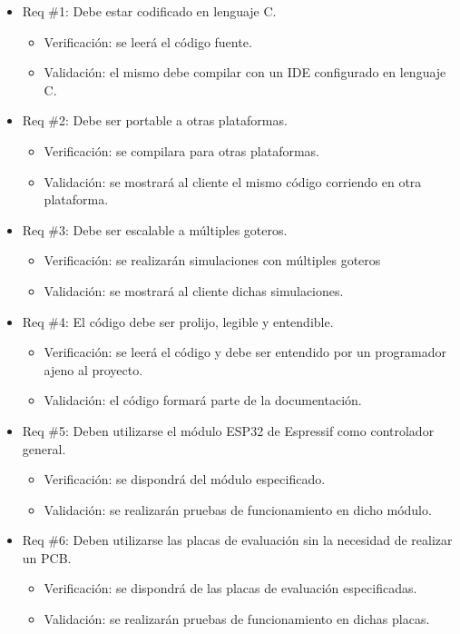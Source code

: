 \documentclass[
11pt, %
]{charter}
\begin{document}
\begin{itemize} 
\item Req \#1: Debe estar codificado en lenguaje C.
\begin{itemize}
	\item Verificación: se leerá el código fuente.
	\item Validación: el mismo debe compilar con un IDE configurado en lenguaje C.
\end{itemize}

\item Req \#2: Debe ser portable a otras plataformas.
\begin{itemize}
	\item Verificación: se compilara para otras plataformas.
	\item Validación: se mostrará al cliente el mismo código corriendo en otra plataforma.
\end{itemize}

\item Req \#3: Debe ser escalable a múltiples goteros.
\begin{itemize}
	\item Verificación: se realizarán simulaciones con múltiples goteros
	\item Validación: se mostrará al cliente dichas simulaciones.
\end{itemize}

\item Req \#4: El código debe ser prolijo, legible y entendible.
\begin{itemize}
	\item Verificación: se leerá el código y debe ser entendido por un programador ajeno al proyecto.
	\item Validación: el código formará parte de la documentación.
\end{itemize}

\item Req \#5: Deben utilizarse el módulo ESP32 de Espressif como controlador general.
\begin{itemize}
	\item Verificación: se dispondrá del módulo especificado.
	\item Validación: se realizarán pruebas de funcionamiento en dicho módulo.
\end{itemize}

\item Req \#6: Deben utilizarse las placas de evaluación sin la necesidad de realizar un PCB.
\begin{itemize}
	\item Verificación: se dispondrá de las placas de evaluación especificadas.
	\item Validación: se realizarán pruebas de funcionamiento en dichas placas.
\end{itemize}


\end{itemize}
\end{document}
